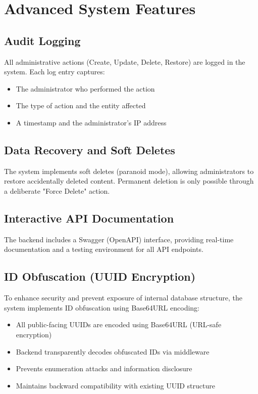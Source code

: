 \documentclass[12pt,a4paper]{article}
\begin{document}
\section{Advanced System Features}

\subsection{Audit Logging}
All administrative actions (Create, Update, Delete, Restore) are logged in the system. Each log entry captures:
\begin{itemize}
    \item The administrator who performed the action
    \item The type of action and the entity affected
    \item A timestamp and the administrator's IP address
\end{itemize}

\subsection{Data Recovery and Soft Deletes}
The system implements soft deletes (paranoid mode), allowing administrators to restore accidentally deleted content. Permanent deletion is only possible through a deliberate "Force Delete" action.

\subsection{Interactive API Documentation}
The backend includes a Swagger (OpenAPI) interface, providing real-time documentation and a testing environment for all API endpoints.

\subsection{ID Obfuscation (UUID Encryption)}
To enhance security and prevent exposure of internal database structure, the system implements ID obfuscation using Base64URL encoding:

\begin{itemize}
    \item All public-facing UUIDs are encoded using Base64URL (URL-safe encryption)
    \item Backend transparently decodes obfuscated IDs via middleware
    \item Prevents enumeration attacks and information disclosure
    \item Maintains backward compatibility with existing UUID structure
\end{itemize}
\end{document}
